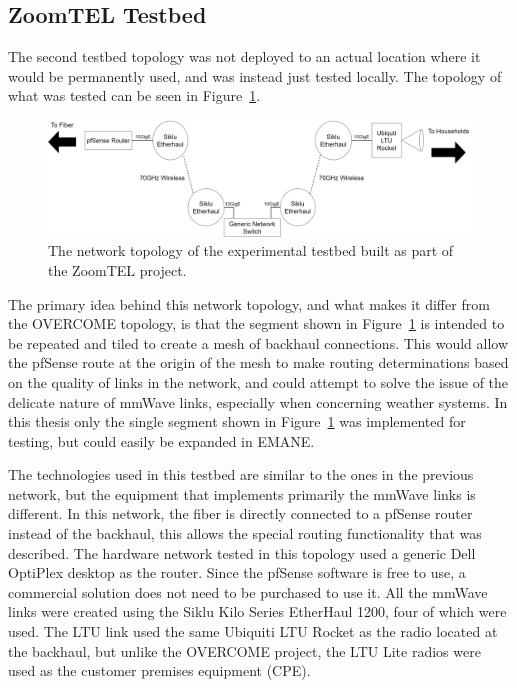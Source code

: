 \subsection{ZoomTEL Testbed}
The second testbed topology was not deployed to an actual location where it would be permanently used, and was instead just tested locally.
The topology of what was tested can be seen in Figure~\ref{zoomtel_topology}.
\begin{figure}[!ht]
    \centering
    \includegraphics[width=\textwidth,keepaspectratio]{Images/Chpt3/ZoomTEL_Topology.png}
    \caption{The network topology of the experimental testbed built as part of the ZoomTEL project.}
    \label{zoomtel_topology}
\end{figure}
The primary idea behind this network topology, and what makes it differ from the OVERCOME topology, is that the segment shown in Figure~\ref{zoomtel_topology} is intended to be repeated and tiled to create a mesh of backhaul connections.
This would allow the pfSense route at the origin of the mesh to make routing determinations based on the quality of links in the network, and could attempt to solve the issue of the delicate nature of mmWave links, especially when concerning weather systems.
In this thesis only the single segment shown in Figure~\ref{zoomtel_topology} was implemented for testing, but could easily be expanded in EMANE.\par
The technologies used in this testbed are similar to the ones in the previous network, but the equipment that implements primarily the mmWave links is different.
In this network, the fiber is directly connected to a pfSense router instead of the backhaul, this allows the special routing functionality that was described.
The hardware network tested in this topology used a generic Dell OptiPlex desktop as the router.
Since the pfSense software is free to use, a commercial solution does not need to be purchased to use it.
All the mmWave links were created using the Siklu Kilo Series EtherHaul 1200, four of which were used.
The LTU link used the same Ubiquiti LTU Rocket as the radio located at the backhaul, but unlike the OVERCOME project, the LTU Lite radios were used as the customer premises equipment (CPE).


